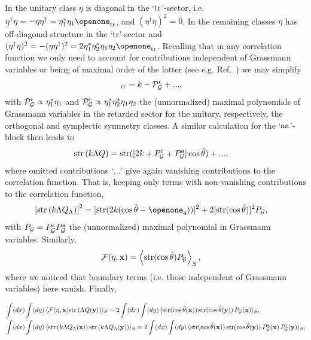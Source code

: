 \documentclass[twocolumn,showpacs,aps,prl]{revtex4}
\begin{document}
In the unitary class 
 $\eta$ is diagonal in the 
 `${\rm tr}$'-sector, i.e. 
$\eta^\dagger\eta=-\eta \eta^\dagger
=\eta_1^\ast\eta_1\openone_{\rm tr}$,
and 
$(\eta^\dagger  \eta)^2=0$.
In the remaining classes $\eta$
has off-diagonal structure in the `{\rm tr}'-sector and 
$(\eta^\dagger  \eta)^2
=-(\eta  \eta^\dagger )^2
=2\eta_1^\ast \eta_2^\ast \eta_1\eta_2\openone_{\rm tr}$.
Recalling that   
in any correlation function we only need 
to account for contributions 
independent of Grassmann variables 
or being of maximal order of the latter 
(see e.g. Ref.~) 
we may simplify
\begin{align}
[ k U_2^{-1}U_1^{2}U_2]_{\rm rr}
&=
k
-
{\cal P}_{\cal G}^{\rm r}
+
...,
\end{align}
with 
${\cal P}_{\cal G}^{\rm r}\propto \eta_1^\ast\eta_1$ 
and
${\cal P}_{\cal G}^{\rm r}\propto \eta_1^\ast \eta_2^\ast \eta_1\eta_2$  
the (unnormalized) maximal polynomials 
of Grassmann variables in the retarded sector 
for the unitary, respectively, the orthogonal and symplectic
symmetry classes. 
A similar calculation for the `${\rm aa}$'-block  
then leads to 
 \begin{align}
{\rm str}\left(k\Lambda Q\right)
&=
{\rm str}( 
[2k+P_{\cal G}^{\rm r}
+
P_{\cal G}^{\rm a}]
\cos\hat{\theta}) 
+...,
\end{align}
where omitted contributions `$...$' give again  vanishing contributions to the correlation function.
That is, keeping only terms with non-vanishing contributions to the correlation function,
\begin{align}
\left[
{\rm str}\left(k\Lambda Q_\Lambda \right) 
\right]^2
&=
[{\rm str} 
(2k (\cos\hat{\theta}- \openone_4) )  
]^2
+
2 [{\rm str}( 
\cos\hat{\theta})  
]^2
P_{\cal G}, 
\end{align}
with 
$P_{\cal G}=
P_{\cal G}^{\rm r}
P_{\cal G}^{\rm a}$ 
the (unnormalized) maximal polynomial in Grassmann variables.
Similarly,
 \begin{align}
 \label{SMgf}
{\cal F}(\eta,\bold{x})
 &=
\left\langle 
{\rm str}( 
\cos\hat{\theta})
P_{\cal G} 
\right\rangle_S,
\end{align}
where we noticed that 
boundary terms 
(i.e. those independent of Grassmann variables) here vanish.
Finally, 
\begin{widetext}
\begin{align}
&\int (dx)\int (dy)\,
\langle
{\cal F}(\eta,\bold{x})
{\rm str}\left(\Lambda Q(\bold{y})\right)
\rangle_S
=
2
\int (dx)\int (dy)\,
\langle
{\rm str}(\cos\hat{\theta}(\bold{x}))\,
{\rm str}(\cos\hat{\theta}(\bold{y}))\,
P_{\cal G}(\bold{x})
\rangle_S,
\\
&\int (dx)\int (dy)\,
\langle
{\rm str}\left(k\Lambda Q_\Lambda(\bold{x})\right)
{\rm str}\left(k\Lambda Q_\Lambda(\bold{y})\right)
\rangle_S
=
2
\int (dx)\int (dy)\,
\langle
{\rm str}(\cos\hat{\theta}(\bold{x}))\,
{\rm str}(\cos\hat{\theta}(\bold{y}))\,
P_{\cal G}^{\rm a}(\bold{x})\,
P_{\cal G}^{\rm r}(\bold{y})
\rangle_S,
\end{align}
\end{widetext}
\end{document}
